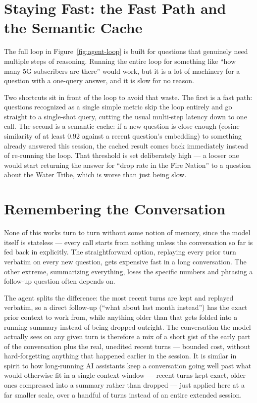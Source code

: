 \section{Staying Fast: the Fast Path and the Semantic Cache}

The full loop in Figure~\ref{fig:agent-loop} is built for questions
that genuinely need multiple steps of reasoning. Running the entire
loop for something like ``how many 5G subscribers are there'' would
work, but it is a lot of machinery for a question with a one-query
answer, and it is slow for no reason.

Two shortcuts sit in front of the loop to avoid that waste. The first
is a fast path: questions recognized as a single simple metric skip
the loop entirely and go straight to a single-shot query, cutting the
usual multi-step latency down to one call. The second is a semantic
cache: if a new question is close enough (cosine similarity of at
least 0.92 against a recent question's embedding) to something already
answered this session, the cached result comes back immediately
instead of re-running the loop. That threshold is set deliberately
high --- a looser one would start returning the answer for ``drop rate
in the Fire Nation'' to a question about the Water Tribe, which is
worse than just being slow.

\section{Remembering the Conversation}

None of this works turn to turn without some notion of memory, since
the model itself is stateless --- every call starts from nothing
unless the conversation so far is fed back in explicitly. The
straightforward option, replaying every prior turn verbatim on every
new question, gets expensive fast in a long conversation. The other
extreme, summarizing everything, loses the specific numbers and
phrasing a follow-up question often depends on.

The agent splits the difference: the most recent turns are kept and
replayed verbatim, so a direct follow-up (``what about last month
instead'') has the exact prior context to work from, while anything
older than that gets folded into a running summary instead of being
dropped outright. The conversation the model actually sees on any
given turn is therefore a mix of a short gist of the early part of the
conversation plus the real, unedited recent turns --- bounded cost,
without hard-forgetting anything that happened earlier in the session.
It is similar in spirit to how long-running AI assistants keep a
conversation going well past what would otherwise fit in a single
context window --- recent turns kept exact, older ones compressed into
a summary rather than dropped --- just applied here at a far smaller
scale, over a handful of turns instead of an entire extended session.

